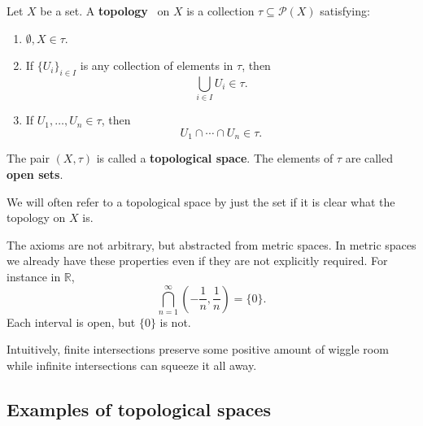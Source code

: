 \begin{defn}
    Let $X$ be a set. A \textbf{topology} 
    on $X$ is a collection $\tau \subseteq 
    \mathcal P(X)$ satisfying: 
    \begin{enumerate}
        \item $\emptyset, X \in \tau$.
        \item If $\{U_i\}_{i\in I}$ is any collection of elements 
            in $\tau$, then 
            \[
                \bigcup_{i\in I}U_i \in \tau. 
            \]
        \item If $U_1, \ldots, U_n \in \tau$, then 
            \[
                U_1 \cap \cdots \cap U_n \in \tau. 
            \]
    \end{enumerate}
    The pair $(X,\tau)$ is called a \textbf{topological space}. 
    The elements of $\tau$ are called \textbf{open sets}.
\end{defn}
We will often refer to a topological space by just 
the set if it is clear what the topology on $X$ is.  

The axioms are not arbitrary, but abstracted from metric spaces. 
In metric spaces we already have these properties even if they 
are not explicitly required. 
For instance in $\mathbb R$, 
\[
    \bigcap_{n=1}^\infty \left(-\frac{1}{n},\frac{1}{n}\right) 
    = \{0\}. 
\]
Each interval is open, but $\{0\}$ is not. 

Intuitively, finite intersections preserve some positive amount of 
wiggle room while infinite intersections can squeeze it all away. 

\subsection*{Examples of topological spaces}

